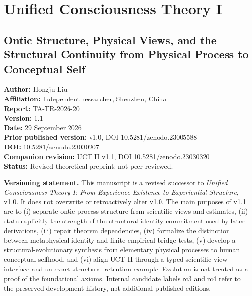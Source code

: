 \documentclass[
  11pt,
  a4paper,
]{article}
\author{}
\date{}
\begin{document}
\hypertarget{unified-consciousness-theory-i}{%
\section{Unified Consciousness Theory
I}\label{unified-consciousness-theory-i}}

\hypertarget{ontic-structure-physical-views-and-the-structural-continuity-from-physical-process-to-conceptual-self}{%
\subsection{Ontic Structure, Physical Views, and the Structural
Continuity from Physical Process to Conceptual
Self}\label{ontic-structure-physical-views-and-the-structural-continuity-from-physical-process-to-conceptual-self}}

\textbf{Author:} Hongju Liu\\
\textbf{Affiliation:} Independent researcher, Shenzhen, China\\
\textbf{Report:} TA-TR-2026-20\\
\textbf{Version:} 1.1\\
\textbf{Date:} 29 September 2026\\
\textbf{Prior published version:} v1.0, DOI 10.5281/zenodo.23005588\\
\textbf{DOI:} 10.5281/zenodo.23030207\\
\textbf{Companion revision:} UCT II v1.1, DOI 10.5281/zenodo.23030320\\
\textbf{Status:} Revised theoretical preprint; not peer reviewed.

\textbf{Versioning statement.} This manuscript is a revised successor to
\emph{Unified Consciousness Theory I: From Experience Existence to
Experiential Structure}, v1.0. It does not overwrite or retroactively
alter v1.0. The main purposes of v1.1 are to (i) separate ontic process
structure from scientific views and estimates, (ii) state explicitly the
strength of the structural-identity commitment used by later
derivations, (iii) repair theorem dependencies, (iv) formalize the
distinction between metaphysical identity and finite empirical bridge
tests, (v) develop a structural-evolutionary synthesis from elementary
physical processes to human conceptual selfhood, and (vi) align UCT II
through a typed scientific-view interface and an exact
structural-retention example. Evolution is not treated as a proof of the
foundational axioms. Internal candidate labels rc3 and rc4 refer to the
preserved development history, not additional published editions.
\end{document}
